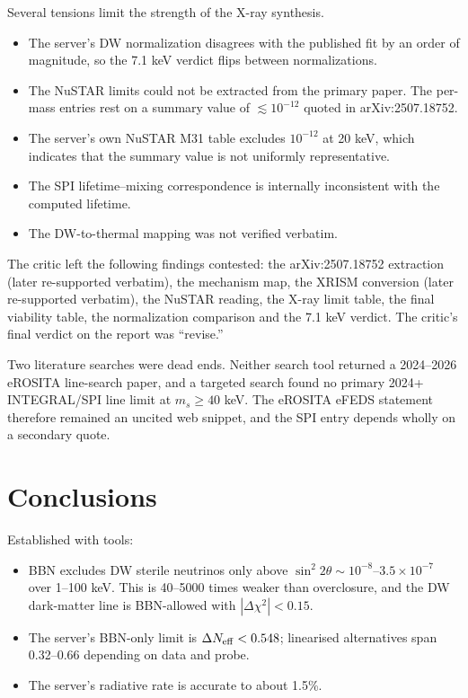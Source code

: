 \documentclass[11pt,a4paper]{article}
\begin{document}
Several tensions limit the strength of the X-ray synthesis.
\begin{itemize}
\item The server's DW normalization disagrees with the published fit by an order of magnitude, so the 7.1 keV verdict flips between normalizations.
\item The NuSTAR limits could not be extracted from the primary paper. The per-mass entries rest on a summary value of $\lesssim10^{-12}$ quoted in arXiv:2507.18752.
\item The server's own NuSTAR M31 table excludes $10^{-12}$ at 20 keV, which indicates that the summary value is not uniformly representative.
\item The SPI lifetime--mixing correspondence is internally inconsistent with the computed lifetime.
\item The DW-to-thermal mapping was not verified verbatim.
\end{itemize}

The critic left the following findings contested: the arXiv:2507.18752 extraction (later re-supported verbatim), the mechanism map, the XRISM conversion (later re-supported verbatim), the NuSTAR reading, the X-ray limit table, the final viability table, the normalization comparison and the 7.1 keV verdict. The critic's final verdict on the report was ``revise.''

Two literature searches were dead ends. Neither search tool returned a 2024--2026 eROSITA line-search paper, and a targeted search found no primary 2024+ INTEGRAL/SPI line limit at $m_s\ge40$ keV. The eROSITA eFEDS statement therefore remained an uncited web snippet, and the SPI entry depends wholly on a secondary quote.

\section{Conclusions}
Established with tools:
\begin{itemize}
\item BBN excludes DW sterile neutrinos only above $\sin^2 2\theta\sim10^{-8}$--$3.5\times10^{-7}$ over 1--100 keV. This is 40--5000 times weaker than overclosure, and the DW dark-matter line is BBN-allowed with $|\Delta\chi^2|<0.15$.
\item The server's BBN-only limit is $\Delta N_{\rm eff}<0.548$; linearised alternatives span 0.32--0.66 depending on data and probe.
\item The server's radiative rate is accurate to about 1.5\%.
\end{itemize}
\end{document}
